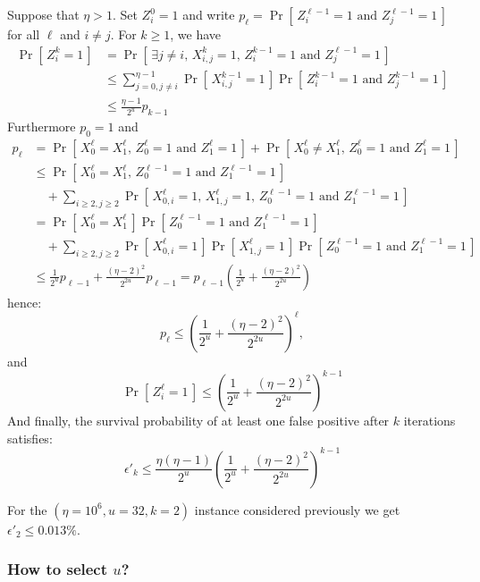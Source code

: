 \documentclass[11pt]{llncs}
\newcommand{\Prob}[1]{{\Pr\left[\,{#1}\,\right]}}
\begin{document}
Suppose that $\eta > 1$.
Set $Z^0_i = 1$ and write $p_\ell = \Prob{Z^{\ell-1}_{i} = 1 \text{ and } Z^{\ell-1}_{j} = 1} $ for all $\ell$ and $i \neq j$.
For $k \ge 1$, we have
\begin{align*}
\Prob{Z^k_i=1} &= \Prob{\exists j\neq i \text{, } X^k_{i,j} = 1 \text{, } Z^{k-1}_{i} = 1  \text{ and } Z^{\ell-1}_{j} = 1}  \\
&\le \sum_{j=0, j\neq i}^{\eta-1} \Prob{X^{k-1}_{i,j} = 1} \Prob{Z^{k-1}_{i} = 1 \text{ and } Z^{k-1}_{j} = 1}  \\
&\le \frac{\eta-1}{2^u} p_{k-1}
\end{align*}
Furthermore $p_0 = 1$ and
\begin{align*}
p_\ell &= \Prob{X^{\ell}_0 = X^{\ell}_1 \text{, } Z^{\ell}_{0} = 1 \text{ and } Z^{\ell}_{1} = 1}
  + \Prob{X^{\ell}_0 \neq X^{\ell}_1 \text{, } Z^{\ell}_{0} = 1 \text{ and } Z^{\ell}_{1} = 1} \\
&\le \Prob{X^{\ell}_0 = X^{\ell}_1 \text{, } Z^{\ell-1}_{0} = 1 \text{ and } Z^{\ell-1}_{1} = 1} \\
  &\quad+ \sum_{i \ge 2, j \ge 2} \Prob{X^\ell_{0,i} = 1 \text{, } X^\ell_{1,j} = 1 \text{, } Z^{\ell-1}_{0} = 1 \text{ and } Z^{\ell-1}_{1} = 1} \\
&= \Prob{X^{\ell}_0 = X^{\ell}_1} \Prob{Z^{\ell-1}_{0} = 1 \text{ and } Z^{\ell-1}_{1} = 1} \\
  &\quad+ \sum_{i \ge 2, j \ge 2} \Prob{X^\ell_{0,i} = 1} \Prob{X^\ell_{1,j} = 1} \Prob{Z^{\ell-1}_{0} = 1 \text{ and } Z^{\ell-1}_{1} = 1} \\
&\le \frac{1}{2^u} p_{\ell-1} + \frac{(\eta-2)^2}{2^{2u}} p_{\ell-1} = p_{\ell-1}\left(\frac{1}{2^u}  + \frac{(\eta-2)^2}{2^{2u}}\right)
\end{align*}
hence:
\[ p_\ell \le \left( \frac{1}{2^u} + \frac{(\eta-2)^2}{2^{2u}} \right)^\ell, \]
and
\[ \Prob{Z^\ell_i=1} \le \left( \frac{1}{2^u} + \frac{(\eta-2)^2}{2^{2u}} \right)^{k-1} \]
And finally, the survival probability of at least one false positive after $k$ iterations satisfies:
\[
\epsilon'_k \le \frac{\eta(\eta-1)}{2^u} \left( \frac{1}{2^u} + \frac{(\eta-2)^2}{2^{2u}} \right)^{k-1}
\]

For the $(\eta=10^6,u=32,k=2)$ instance considered previously we get $\epsilon'_2 \le 0.013\%$.\smallskip

\subsubsection{How to select $u$?}
\end{document}
